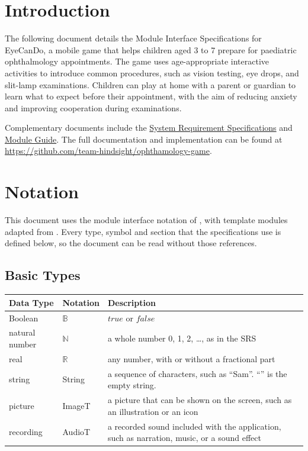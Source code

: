 \documentclass[10pt, titlepage]{article}
\newcommand{\srsurl}{https://team-hindsight.github.io/ophthamology-game/SRS/SRS.pdf}
\newcommand{\mgurl}{https://github.com/team-hindsight/ophthamology-game/blob/main/pdfs/Design/SoftArchitecture/MG.pdf}
\newcommand{\B}{\mathbb{B}}
\newcommand{\N}{\mathbb{N}}
\newcommand{\R}{\mathbb{R}}
\newcommand{\true}{\mathit{true}}
\newcommand{\false}{\mathit{false}}
\begin{document}
\newpage

\section{Introduction}

The following document details the Module Interface Specifications for
EyeCanDo, a mobile game that helps children aged 3 to 7 prepare for paediatric
ophthalmology appointments. The game uses age-appropriate interactive activities
to introduce common procedures, such as vision testing, eye drops, and slit-lamp
examinations. Children can play at home with a parent or guardian to learn what
to expect before their appointment, with the aim of reducing anxiety and
improving cooperation during examinations.

Complementary documents include the
\href{\srsurl}{System Requirement Specifications}
and \href{\mgurl}{Module Guide}.
The full documentation and implementation can be found at
\url{https://github.com/team-hindsight/ophthamology-game}.

\newpage
\section{Notation}\label{SecNotation}

This document uses the module interface notation of \cite{HoffmanAndStrooper1995},
with template modules adapted from \cite{GhezziEtAl2003}. Every type, symbol
and section that the specifications use is defined below, so the document can
be read without those references.

\subsection{Basic Types}

\begin{center}
\renewcommand{\arraystretch}{1.2}
\begin{tabular}{l l p{8cm}}
\toprule
\textbf{Data Type} & \textbf{Notation} & \textbf{Description}\\
\midrule
Boolean & $\B$ & $\true$ or $\false$\\
natural number & $\N$ & a whole number 0, 1, 2, \ldots, as in the SRS\\
real & $\R$ & any number, with or without a fractional part\\
string & String & a sequence of characters, such as ``Sam''. ``'' is the empty
string.\\
picture & ImageT & a picture that can be shown on the screen, such as an
illustration or an icon\\
recording & AudioT & a recorded sound included with the application, such as
narration, music, or a sound effect\\
\bottomrule
\end{tabular}
\end{center}
\end{document}
